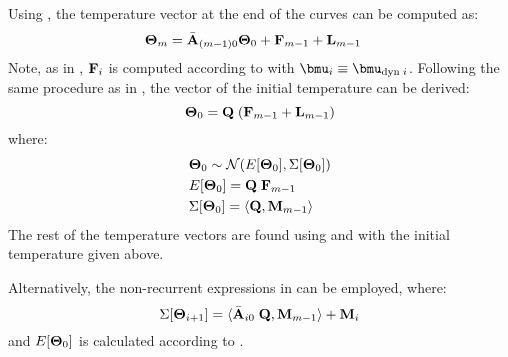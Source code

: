 Using , the temperature vector at the end of the curves can be computed as:
\begin{align*}
  \mathbf{\Theta}_{m} & = \Bar{\mathbf{A}}_{(m - 1)0} \mathbf{\Theta}_0 + \mathbf{F}_{m - 1} + \mathbf{L}_{m - 1}
\end{align*}
Note, as in , $\mathbf{F}_i$ is computed according to  with $\vmean{i} \equiv \vmean{\dyn \; i}$. Following the same procedure as in , the vector of the initial temperature can be derived:
\[
  \mathbf{\Theta}_0 = \mathbf{Q} \; (\mathbf{F}_{m - 1} + \mathbf{L}_{m - 1})
\]
where:
\begin{align}
  & \vtemp_0 \sim \normal(\expect{\vtemp_0}, \cov{\vtemp_0}) \equlabel{dssta-initial-temperature-noise} \\
  & \expect{\vtemp_0} = \m{Q} \; \v{F}_{\stepcount - 1} \nonumber \\
  & \cov{\vtemp_0} = \dbl{\m{Q}, \m{M}_{\stepcount - 1}} \nonumber
\end{align}
The rest of the temperature vectors are found using  and  with the initial temperature given above.

Alternatively, the non-recurrent expressions in  can be employed, where:
\[
  \Sigma[\mathbf{\Theta}_{i + 1}] = \langle \Bar{\mathbf{A}}_{i0} \; \mathbf{Q}, \mathbf{M}_{m - 1} \rangle + \mathbf{M}_i
\]
and $E[\mathbf{\Theta}_0]$ is calculated according to .
